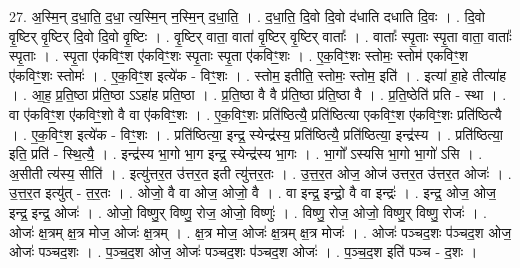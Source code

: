 \documentclass[17pt]{extarticle}
\begin{document}
27. अ॒स्मि॒न् द॒धा॒ति॒ द॒धा॒ त्य॒स्मि॒न् न॒स्मि॒न् द॒धा॒ति॒ । . द॒धा॒ति॒ दि॒वो दि॒वो द॑धाति दधाति दि॒वः । . दि॒वो वृ॒ष्टिर् वृ॒ष्टिर् दि॒वो दि॒वो वृ॒ष्टिः । . वृ॒ष्टिर् वाता॒ वाता॑ वृ॒ष्टिर् वृ॒ष्टिर् वाताः᳚ । . वाताः᳚ स्पृ॒ताः स्पृ॒ता वाता॒ वाताः᳚ स्पृ॒ताः । . स्पृ॒ता ए॑कविꣳ॒॒श ए॑कविꣳ॒॒शः स्पृ॒ताः स्पृ॒ता ए॑कविꣳ॒॒शः । . ए॒क॒विꣳ॒॒शः स्तोमः॒ स्तोम॑ एकविꣳ॒॒श ए॑कविꣳ॒॒शः स्तोमः॑ । . ए॒क॒विꣳ॒॒श इत्ये॑क - विꣳ॒॒शः । . स्तोम॒ इतीति॒ स्तोमः॒ स्तोम॒ इति॑ । . इत्या॑ हा॒हे तीत्या॑ह । . आ॒ह॒ प्र॒ति॒ष्ठा प्र॑ति॒ष्ठा ऽऽहा॑ह प्रति॒ष्ठा । . प्र॒ति॒ष्ठा वै वै प्र॑ति॒ष्ठा प्र॑ति॒ष्ठा वै । . प्र॒ति॒ष्ठेति॑ प्रति - स्था । . वा ए॑कविꣳ॒॒श ए॑कविꣳ॒॒शो वै वा ए॑कविꣳ॒॒शः । . ए॒क॒विꣳ॒॒शः प्रति॑ष्ठित्यै॒ प्रति॑ष्ठित्या एकविꣳ॒॒श ए॑कविꣳ॒॒शः प्रति॑ष्ठित्यै । . ए॒क॒विꣳ॒॒श इत्ये॑क - विꣳ॒॒शः । . प्रति॑ष्ठित्या॒ इन्द्र॒ स्येन्द्र॑स्य॒ प्रति॑ष्ठित्यै॒ प्रति॑ष्ठित्या॒ इन्द्र॑स्य । . प्रति॑ष्ठित्या॒ इति॒ प्रति॑ - स्थि॒त्यै॒ । . इन्द्र॑स्य भा॒गो भा॒ग इन्द्र॒ स्येन्द्र॑स्य भा॒गः । . भा॒गो᳚ ऽस्यसि भा॒गो भा॒गो॑ ऽसि । . अ॒सीती त्य॑स्य॒ सीति॑ । . इत्यु॑त्तर॒त उ॑त्तर॒त इती त्यु॑त्तर॒तः । . उ॒त्त॒र॒त ओज॒ ओज॑ उत्तर॒त उ॑त्तर॒त ओजः॑ । . उ॒त्त॒र॒त इत्यु॑त् - त॒र॒तः । . ओजो॒ वै वा ओज॒ ओजो॒ वै । . वा इन्द्र॒ इन्द्रो॒ वै वा इन्द्रः॑ । . इन्द्र॒ ओज॒ ओज॒ इन्द्र॒ इन्द्र॒ ओजः॑ । . ओजो॒ विष्णु॒र् विष्णु॒ रोज॒ ओजो॒ विष्णुः॑ । . विष्णु॒ रोज॒ ओजो॒ विष्णु॒र् विष्णु॒ रोजः॑ । . ओजः॑ क्ष॒त्रम् क्ष॒त्र मोज॒ ओजः॑ क्ष॒त्रम् । . क्ष॒त्र मोज॒ ओजः॑ क्ष॒त्रम् क्ष॒त्र मोजः॑ । . ओजः॑ पञ्चद॒शः प॑ञ्चद॒श ओज॒ ओजः॑ पञ्चद॒शः । . प॒ञ्च॒द॒श ओज॒ ओजः॑ पञ्चद॒शः प॑ञ्चद॒श ओजः॑ । . प॒ञ्च॒द॒श इति॑ पञ्च - द॒शः । \newline
\end{document}
